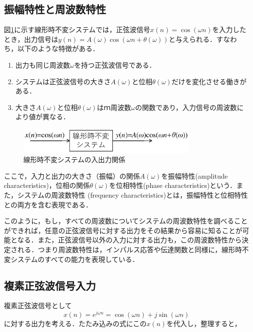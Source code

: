 \subsection{振幅特性と周波数特性}

図\ref{fig:zu-3-10}に示す線形時不変システムでは，正弦波信号$x(n)=\cos (\omega n)$を入力したとき，出力信号は$y(n)=A(\omega ) \cos (\omega n + \theta (\omega))$と与えられる．すなわち，以下のような特徴がある．
\begin{enumerate}
\item 出力も同じ周波数$\omega$を持つ正弦波信号である．
\item システムは正弦波信号の大きさ$A(\omega)$と位相$\theta(\omega)$だけを変化させる働きがある．
\item 大きさ$A(\omega)$と位相$\theta(\omega)$はｍ周波数$\omega$の関数であり，入力信号の周波数により値が異なる．
\end{enumerate}

\begin{figure}[H]
\begin{center}
\includegraphics[width=9cm]{fig/zu-3-10.eps}
\end{center}
\caption{線形時不変システムの入出力関係}
\label{fig:zu-3-10}
\end{figure}

ここで，入力と出力の大きさ（振幅）の関係$A(\omega)$を振幅特性(amplitude characteristics)，位相の関係$\theta(\omega)$を位相特性(phase characteristics)という．また，システムの周波数特性 (frequency characteristics)とは，振幅特性と位相特性との両方を含む表現である．

このように，もし，すべての周波数についてシステムの周波数特性を調べることができれば，任意の正弦波信号に対する出力をその結果から容易に知ることが可能となる．また，正弦波信号以外の入力に対する出力も，この周波数特性から決定される．つまり周波数特性は，インパルス応答や伝達関数と同様に，線形時不変システムのすべての能力を表現している．

\subsection{複素正弦波信号入力}

複素正弦波信号として
\begin{equation}
x(n)=e^{j\omega n}= \cos (\omega n) +j\sin (\omega n)
\end{equation}
に対する出力を考える．たたみ込みの式にこの$x(n)$を代入し，整理すると，


